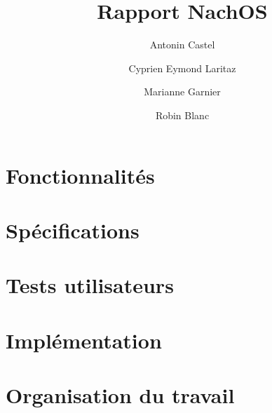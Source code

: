 \documentclass{report}
\title{Rapport NachOS}
\author{Antonin Castel \and
		Cyprien Eymond Laritaz \and
		Marianne Garnier \and
		Robin Blanc}
\begin{document}
\maketitle

\chapter*{Fonctionnalités}
\chapter*{Spécifications}
\chapter*{Tests utilisateurs}
\chapter*{Implémentation}
\chapter*{Organisation du travail}
\end{document}
